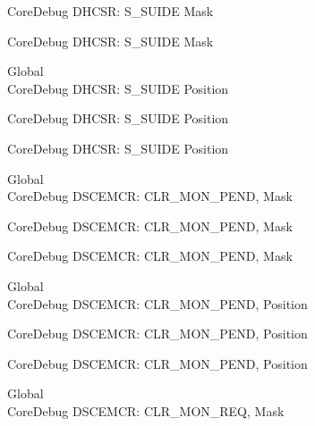 \begin{DoxyRefList}
\label{deprecated__deprecated000467}%
%
Core\+Debug DHCSR\+: S\+\_\+\+SUIDE Mask 

\label{deprecated__deprecated000569}%
%
Core\+Debug DHCSR\+: S\+\_\+\+SUIDE Mask  
\item[Global \doxylink{group___c_m_s_i_s___s_c_b_gacff001d7e8c9665a1dc91018f2505d3d}{Core\+Debug\+\_\+\+DHCSR\+\_\+\+S\+\_\+\+SUIDE\+\_\+\+Pos} ]\hfill \\
\label{deprecated__deprecated000015}%
%
Core\+Debug DHCSR\+: S\+\_\+\+SUIDE Position 

\label{deprecated__deprecated000466}%
%
Core\+Debug DHCSR\+: S\+\_\+\+SUIDE Position 

\label{deprecated__deprecated000568}%
%
Core\+Debug DHCSR\+: S\+\_\+\+SUIDE Position  
\item[Global \doxylink{group___c_m_s_i_s___s_c_b_gacfb17801664286ab627a094d5fb3da20}{Core\+Debug\+\_\+\+DSCEMCR\+\_\+\+CLR\+\_\+\+MON\+\_\+\+PEND\+\_\+\+Msk} ]\hfill \\
\label{deprecated__deprecated000074}%
%
Core\+Debug DSCEMCR\+: CLR\+\_\+\+MON\+\_\+\+PEND, Mask 

\label{deprecated__deprecated000525}%
%
Core\+Debug DSCEMCR\+: CLR\+\_\+\+MON\+\_\+\+PEND, Mask 

\label{deprecated__deprecated000627}%
%
Core\+Debug DSCEMCR\+: CLR\+\_\+\+MON\+\_\+\+PEND, Mask  
\item[Global \doxylink{group___c_m_s_i_s___s_c_b_ga2295235d9c595bd6f287728f4c395bbf}{Core\+Debug\+\_\+\+DSCEMCR\+\_\+\+CLR\+\_\+\+MON\+\_\+\+PEND\+\_\+\+Pos} ]\hfill \\
\label{deprecated__deprecated000073}%
%
Core\+Debug DSCEMCR\+: CLR\+\_\+\+MON\+\_\+\+PEND, Position 

\label{deprecated__deprecated000524}%
%
Core\+Debug DSCEMCR\+: CLR\+\_\+\+MON\+\_\+\+PEND, Position 

\label{deprecated__deprecated000626}%
%
Core\+Debug DSCEMCR\+: CLR\+\_\+\+MON\+\_\+\+PEND, Position  
\item[Global \doxylink{group___c_m_s_i_s___s_c_b_gaea36b8cede2cc1184176eb20b7bd0f8d}{Core\+Debug\+\_\+\+DSCEMCR\+\_\+\+CLR\+\_\+\+MON\+\_\+\+REQ\+\_\+\+Msk} ]\hfill \\
\label{deprecated__deprecated000072}%
%
Core\+Debug DSCEMCR\+: CLR\+\_\+\+MON\+\_\+\+REQ, Mask 


\end{DoxyRefList}
